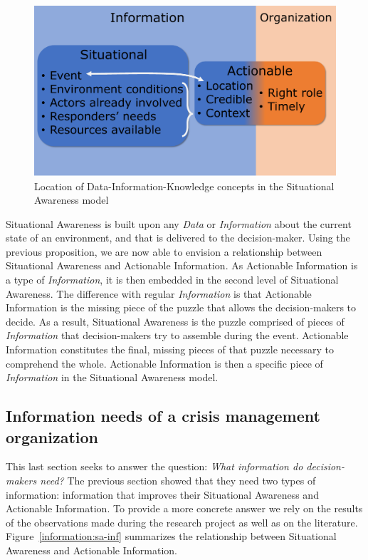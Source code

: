 \begin{figure}[htb]
    \centering
    \includegraphics[width=\textwidth]{figures/chap-3/sa-actio-inf.pdf}
    \caption{Location of Data-Information-Knowledge concepts in the Situational Awareness model}
    \label{information:SA-DIK}
\end{figure}

Situational Awareness is built upon any \textit{Data} or \textit{Information} about the current state of an environment, and that is delivered to the decision-maker.
Using the previous proposition, we are now able to envision a relationship between Situational Awareness and Actionable Information.
As Actionable Information is a type of \textit{Information}, it is then embedded in the second level of Situational Awareness.
The difference with regular \textit{Information} is that Actionable Information is the missing piece of the puzzle that allows the decision-makers to decide.
As a result, Situational Awareness is the puzzle comprised of pieces of \textit{Information} that decision-makers try to assemble during the event.
Actionable Information constitutes the final, missing pieces of that puzzle necessary to comprehend the whole.
Actionable Information is then a specific piece of \textit{Information} in the Situational Awareness model.

\subsection{Information needs of a crisis management organization}
This last section seeks to answer the question: \textit{What information do decision-makers need?}
The previous section showed that they need two types of information: information that improves their Situational Awareness and Actionable Information.
To provide a more concrete answer we rely on the results of the observations made during the research project as well as on the literature.
Figure~\ref{information:sa-inf} summarizes the relationship between Situational Awareness and Actionable Information.

